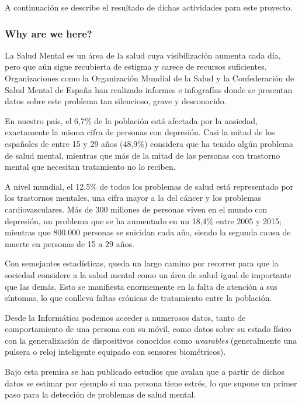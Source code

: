             A continuación se describe el resultado de dichas actividades para este proyecto.
            
            \subsubsection{Why are we here?}
                La Salud Mental es un área de la salud cuya visibilización aumenta cada día, pero que aún sigue recubierta de estigma y carece de recursos suficientes. Organizaciones como la Organización Mundial de la Salud y la Confederación de Salud Mental de España han realizado informes e infografías donde se presentan datos sobre este problema tan silencioso, grave y desconocido.
                
                En nuestro país, el 6,7\% de la población está afectada por la ansiedad, exactamente la misma cifra de personas con depresión. Casi la mitad de los españoles de entre 15 y 29 años (48,9\%) considera que ha tenido algún problema de salud mental, mientras que más de la mitad de las personas con trastorno mental que necesitan tratamiento no lo reciben.
                
                A nivel mundial, el 12,5\% de todos los problemas de salud está representado por los trastornos mentales, una cifra mayor a la del cáncer y los problemas cardiovasculares. Más de 300 millones de personas viven en el mundo con depresión, un problema que se ha aumentado en un 18,4\% entre 2005 y 2015; mientras que 800.000 personas se suicidan cada año, siendo la segunda causa de muerte en personas de 15 a 29 años.
                
                Con semejantes estadísticas, queda un largo camino por recorrer para que la sociedad considere a la salud mental como un área de salud igual de importante que las demás. Esto se manifiesta enormemente en la falta de atención a sus síntomas, lo que conlleva faltas crónicas de tratamiento entre la población.
                
                Desde la Informática podemos acceder a numerosos datos, tanto de comportamiento de una persona con su móvil, como datos sobre su estado físico con la generalización de dispositivos conocidos como \textit{wearables} (generalmente una pulsera o reloj inteligente equipado con sensores biométricos). 
                
                Bajo esta premisa se han publicado estudios \cite{schmidt_introducing_2018} \cite{boukhechba_demonicsalmon_2018} \cite{hickey_smart_2021} \cite{rui_studentlife_2014}  que avalan que a partir de dichos datos se estimar por ejemplo si una persona tiene estrés, lo que supone un primer paso para la detección de problemas de salud mental.
                
